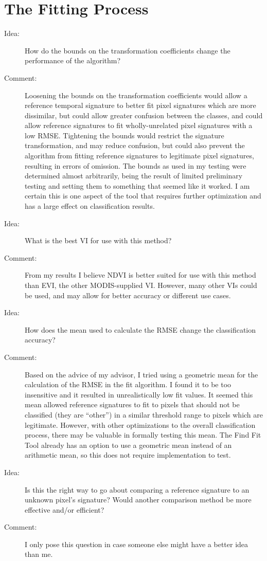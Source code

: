 \section{The Fitting Process}

\begin{description}
\item[Idea:] How do the bounds on the transformation coefficients change the performance of the algorithm?

\item[Comment:] Loosening the bounds on the transformation coefficients would allow a reference temporal signature to better fit pixel signatures which are more dissimilar, but could allow greater confusion between the classes, and could allow reference signatures to fit wholly-unrelated pixel signatures with a low RMSE. Tightening the bounds would restrict the signature transformation, and may reduce confusion, but could also prevent the algorithm from fitting reference signatures to legitimate pixel signatures, resulting in errors of omission. The bounds as used in my testing were determined  almost arbitrarily, being the result of limited preliminary testing and setting them to something that seemed like it worked. I am certain this is one aspect of the tool that requires further optimization and has a large effect on classification results.

\item[Idea:] What is the best VI for use with this method?

\item[Comment:] From my results I believe NDVI is better suited for use with this method than EVI, the other MODIS-supplied VI. However, many other VIs could be used, and may allow for better accuracy or different use cases.

\item[Idea:] How does the mean used to calculate the RMSE change the classification accuracy?

\item[Comment:] Based on the advice of my advisor, I tried using a geometric mean for the calculation of the RMSE in the fit algorithm. I found it to be too insensitive and it resulted in unrealistically low fit values. It seemed this mean allowed reference signatures to fit to pixels that should not be classified (they are “other”) in a similar threshold range to pixels which are legitimate. However, with other optimizations to the overall classification process, there may be valuable in formally testing this mean. The Find Fit Tool already has an option to use a geometric mean instead of an arithmetic mean, so this does not require implementation to test.

\item[Idea:] Is this the right way to go about comparing a reference signature to an unknown pixel’s signature? Would another comparison method be more effective and/or efficient?

\item[Comment:] I only pose this question in case someone else might have a better idea than me.
\end{description}

